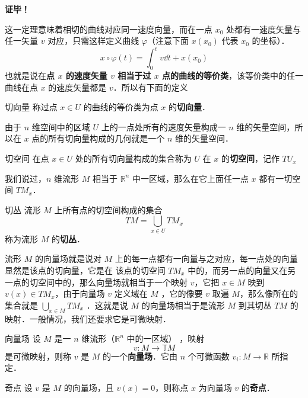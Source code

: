 \textbf{证毕！}

这一定理意味着相切的曲线对应同一速度向量，而在一点 $x_0$ 处都有一速度矢量与任一矢量 $v$ 对应，只需这样定义曲线 $\varphi$（注意下面 $x(x_0)$ 代表 $x_0$ 的坐标）．
\begin{equation}
x\circ\varphi(t)=\int_0^t v\dd t+x(x_0)
\end{equation}
也就是说在\textbf{点 $x$ 的速度矢量 $v$ 相当于过 $x$ 点的曲线的等价类}，该等价类中的任一曲线在点 $x$ 的速度矢量都是 $v$．所以有下面的定义
\begin{definition}{切向量}
称过点 $x\in U$ 的曲线的等价类为点 $x$ 的\textbf{切向量}．
\end{definition}

由于 $n$ 维空间中的区域 $U$ 上的一点处所有的速度矢量构成一 $n$ 维的矢量空间，所以在 $x$ 点的所有切向量构成的几何就是一个 $n$ 维的矢量空间．
\begin{definition}{切空间}
在点 $x\in U$ 处的所有切向量构成的集合称为 $U$ 在 $x$ 的\textbf{切空间}，记作 $TU_x$
\end{definition}

我们说过，$n$ 维流形 $M$ 相当于 $\mathbb R^n$ 中一区域，那么在它上面任一点 $x$ 都有一切空间 $TM_x$．
\begin{definition}{切丛}
流形 $M$ 上所有点的切空间构成的集合
\begin{equation}
TM=\bigcup_{x\in U}TM_x
\end{equation}
称为流形 $M$ 的\textbf{切丛}．
\end{definition} 
流形 $M$ 的向量场就是说对 $M$ 上的每一点都有一向量与之对应，每一点处的向量显然是该点的切向量，它是在 该点的切空间 $TM_x$ 中的，而另一点的向量又在另一点的切空间中的，那么向量场就相当于一个映射 $v$，它把 $x\in M$ 映到 $v(x)\in TM_x$，由于向量场 $v$ 定义域在 $M$ ，它的像要 $v$ 取遍 $M$，那么像所在的集合就是
$\bigcup_{x\in M} TM_x$ ．这就是说 $M$ 的向量场相当于是流形 $M$ 到其切丛 $TM$ 的映射．一般情况，我们还要求它是可微映射．
\begin{definition}{向量场}
设 $M$ 是一 $n$ 维流形（$\mathbb R^n$ 中的一区域） ，映射
\begin{equation}
v:M\rightarrow\mathbb TM
\end{equation}
是可微映射，则称 $v$ 是 $M$ 的一个\textbf{向量场}．它由 $n$ 个可微函数 $v_i:M\rightarrow \mathbb R$ 所指定． 
\end{definition}
\begin{definition}{奇点}
设 $v$ 是 $M$ 的向量场，且 $v(x)=0$，则称点 $x$ 为向量场 $v$ 的\textbf{奇点}．
\end{definition}
